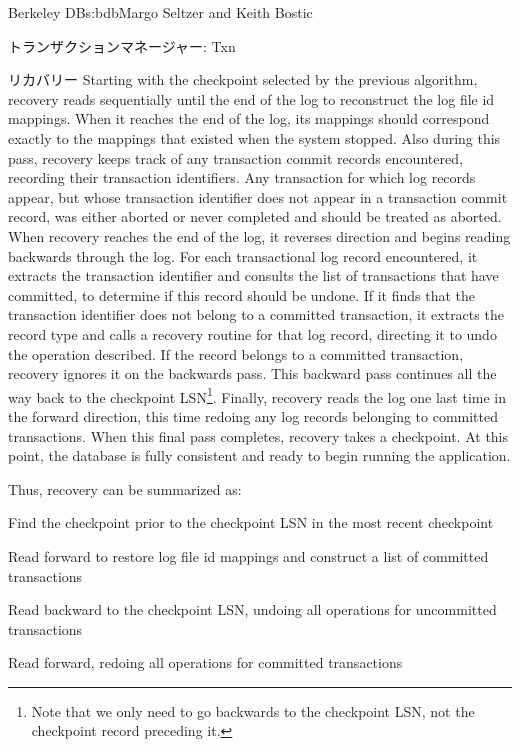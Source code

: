 \begin{aosachapter}{Berkeley DB}{s:bdb}{Margo Seltzer and Keith Bostic}
\begin{aosasect1}{トランザクションマネージャー: Txn}
\begin{aosasect2}{リカバリー}
Starting with the checkpoint selected by the previous algorithm,
recovery reads sequentially until the end of the log to reconstruct
the log file id mappings. When it reaches the end of the log, its
mappings should correspond exactly to the mappings that existed when
the system stopped.  Also during this pass, recovery keeps track of
any transaction commit records encountered, recording their 
transaction identifiers. Any transaction for which log records appear, but
whose transaction identifier does not appear in a transaction commit record,
was either aborted or never completed and should be treated as
aborted. When recovery reaches the end of the log, it reverses
direction and begins reading backwards through the log.  For each
transactional log record encountered, it extracts the transaction identifier
and consults the list of transactions that have committed, to
determine if this record should be undone. If it finds that the transaction
identifier does not belong to a committed transaction, it extracts the record
type and calls a recovery routine for that log record, directing it to
undo the operation described. If the record belongs to a committed
transaction, recovery ignores it on the backwards pass. This backward
pass continues all the way back to the checkpoint LSN\footnote{Note that we only
need to go backwards to the checkpoint LSN, not the checkpoint record
preceding it.}. Finally, recovery reads the log one last time in the
forward direction, this time redoing any log records belonging to
committed transactions. When this final pass completes, recovery takes
a checkpoint. At this point, the database is fully consistent and
ready to begin running the application.

Thus, recovery can be summarized as:

\vspace{-0.2cm}

\begin{aosaenumerate}

  \item Find the checkpoint prior to the checkpoint LSN in the most
  recent checkpoint

  \item Read forward to restore log file id mappings and construct a
  list of committed transactions

  \item Read backward to the checkpoint LSN, undoing all operations for
  uncommitted transactions

  \item Read forward, redoing all operations for committed transactions


\end{aosaenumerate}
\end{aosasect2}
\end{aosasect1}
\end{aosachapter}
